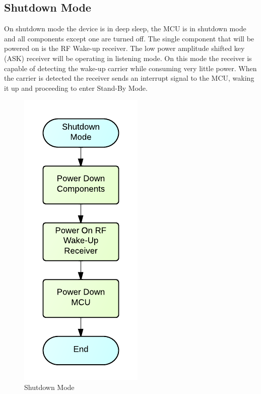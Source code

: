 \subsection{Shutdown Mode}
On shutdown mode the device is in deep sleep, the MCU is in shutdown mode and all components except one are turned off. The single component that will be powered on is the RF Wake-up receiver. The low power amplitude shifted key (ASK) receiver will be operating in listening mode. On this mode the receiver is capable of detecting the wake-up carrier while consuming very little power. When the carrier is detected the receiver sends an interrupt signal to the MCU, waking it up and proceeding to enter Stand-By Mode.
\begin{figure}[H]
	\centering
	\includegraphics[scale=1.0]{img/ShutdownMode}
	\caption{Shutdown Mode \label{fig:shutdownMode}}
\end{figure}

